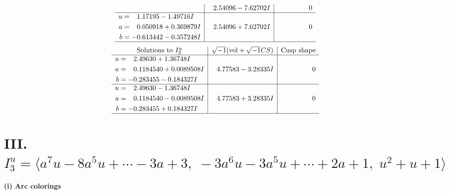 \documentclass[1p]{elsarticle_modified}
\theoremstyle{definition}
\newcommand{\I}{\sqrt{-1}}
\begin{document}
$$\begin{array}{c|c|c}
 & \phantom{-}2.54096 - 7.62702 I & \phantom{-0.000000 } 0 \\ \hline\begin{aligned}
u &= \phantom{-}1.17195 - 1.49716 I \\
a &= \phantom{-}0.050918 + 0.369879 I \\
b &= -0.613442 - 0.357248 I\end{aligned}
 & \phantom{-}2.54096 + 7.62702 I & \phantom{-0.000000 } 0\\
 \hline 
 \end{array}$$\newpage$$\begin{array}{c|c|c}  
\text{Solutions to }I^u_{2}& \I (\text{vol} + \sqrt{-1}CS) & \text{Cusp shape}\\
 \hline 
\begin{aligned}
u &= \phantom{-}2.49630 + 1.36748 I \\
a &= \phantom{-}0.1184540 + 0.0089508 I \\
b &= -0.283455 - 0.184327 I\end{aligned}
 & \phantom{-}4.77583 - 3.28335 I & \phantom{-0.000000 } 0 \\ \hline\begin{aligned}
u &= \phantom{-}2.49630 - 1.36748 I \\
a &= \phantom{-}0.1184540 - 0.0089508 I \\
b &= -0.283455 + 0.184327 I\end{aligned}
 & \phantom{-}4.77583 + 3.28335 I & \phantom{-0.000000 } 0\\
 \hline 
 \end{array}$$\newpage\newpage\renewcommand{\arraystretch}{1}
\centering \section*{III. $I^u_{3}= \langle a^7 u-8 a^5 u+\cdots-3 a+3,\;-3 a^6 u-3 a^5 u+\cdots+2 a+1,\;u^2+u+1 \rangle$}
\flushleft \textbf{(i) Arc colorings}\\
\end{document}
